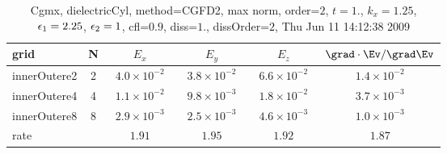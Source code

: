 \begin{table}[hbt]\tableFont %
\begin{center}
\begin{tabular}{|l|c|c|c|c|c|} \hline 
grid  & N &  $E_x$ &  $E_y$ & $E_z$ & $\grad\cdot\Ev/\grad\Ev$\\ \hline 
        innerOutere2 &     2 & ~$4.0\times10^{ -2}$~ & ~$3.8\times10^{ -2}$~ & ~$6.6\times10^{ -2}$~ & ~$1.4\times10^{ -2}$~  \\ \hline
        innerOutere4 &     4 & ~$1.1\times10^{ -2}$~ & ~$9.8\times10^{ -3}$~ & ~$1.8\times10^{ -2}$~ & ~$3.7\times10^{ -3}$~  \\ \hline
        innerOutere8 &     8 & ~$2.9\times10^{ -3}$~ & ~$2.5\times10^{ -3}$~ & ~$4.6\times10^{ -3}$~ & ~$1.0\times10^{ -3}$~  \\ \hline
    rate             &       &       $1.91$          &       $1.95$          &       $1.92$          &       $1.87$           \\ \hline
\end{tabular}
\caption{Cgmx, dielectricCyl, method=CGFD2, max norm, order=$2$, $t=1.$, $k_x=1.25$, $\epsilon_1=2.25$, $\epsilon_2=1$, cfl=$0.9$, diss=$1.$, dissOrder=$2$, Thu Jun 11 14:12:38 2009}\label{table:dielectricCylNFDTDOrder2max}
\end{center}
\end{table}
